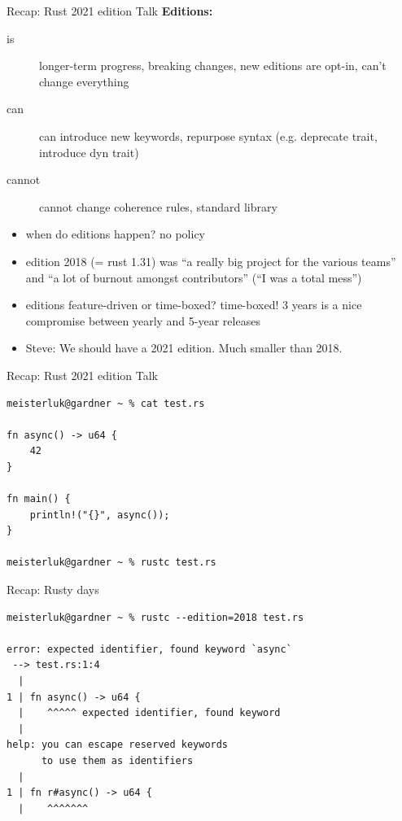 \documentclass{beamer}
\begin{document}
\begin{frame}[fragile]{Recap: Rust 2021 edition Talk}
  \textbf{Editions:}
  \begin{description}
    \item[is] longer-term progress, breaking changes, new editions are opt-in, can't change everything
    \item[can] can {introduce new keywords, repurpose syntax (e.g. deprecate trait, introduce dyn trait)}
    \item[cannot] cannot {change coherence rules, standard library}
  \end{description}
  \begin{itemize}
    \item when do editions happen? no policy
    \item edition 2018 (= rust 1.31) was \enquote{a really big project for the various teams} and \enquote{a lot of burnout amongst contributors} (\enquote{I was a total mess})
    \item editions feature-driven or time-boxed? time-boxed! 3 years is a nice compromise between yearly and 5-year releases
    \item Steve: We should have a 2021 edition. Much smaller than 2018.
  \end{itemize}
\end{frame}

\begin{frame}[fragile]{Recap: Rust 2021 edition Talk}
  \begin{verbatim}
meisterluk@gardner ~ % cat test.rs

fn async() -> u64 {
    42
}

fn main() {
    println!("{}", async());
}

meisterluk@gardner ~ % rustc test.rs
  \end{verbatim}
\end{frame}

\begin{frame}[fragile]{Recap: Rusty days}
  \begin{verbatim}
meisterluk@gardner ~ % rustc --edition=2018 test.rs

error: expected identifier, found keyword `async`
 --> test.rs:1:4
  |
1 | fn async() -> u64 {
  |    ^^^^^ expected identifier, found keyword
  |
help: you can escape reserved keywords
      to use them as identifiers
  |
1 | fn r#async() -> u64 {
  |    ^^^^^^^
  \end{verbatim}
\end{frame}
\end{document}
